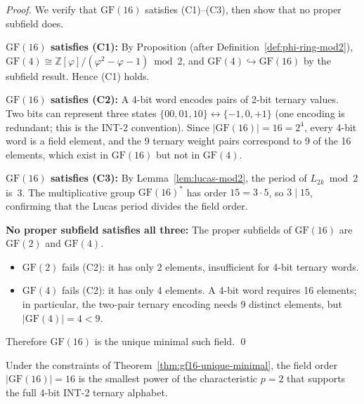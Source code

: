 \begin{proof}
We verify that \(\mathrm{GF}(16)\) satisfies (C1)–(C3), then show
that no proper subfield does.

\medskip
\noindent\textbf{\(\mathrm{GF}(16)\) satisfies (C1):}
By Proposition (after Definition~\ref{def:phi-ring-mod2}),
\(\mathrm{GF}(4) \cong \mathbb{Z}[\varphi]/(\varphi^2-\varphi-1)\bmod 2\),
and \(\mathrm{GF}(4)\hookrightarrow\mathrm{GF}(16)\) by the subfield result.
Hence (C1) holds.

\medskip
\noindent\textbf{\(\mathrm{GF}(16)\) satisfies (C2):}
A 4-bit word encodes pairs of 2-bit ternary values.
Two bits can represent three states \(\{00,01,10\}\leftrightarrow\{-1,0,+1\}\)
(one encoding is redundant; this is the INT-2 convention).
Since \(|\mathrm{GF}(16)|=16=2^4\), every 4-bit word is a field element,
and the 9 ternary weight pairs correspond to 9 of the 16 elements,
which exist in \(\mathrm{GF}(16)\) but not in \(\mathrm{GF}(4)\).

\medskip
\noindent\textbf{\(\mathrm{GF}(16)\) satisfies (C3):}
By Lemma~\ref{lem:lucas-mod2}, the period of \(L_{2k}\bmod 2\) is~3.
The multiplicative group \(\mathrm{GF}(16)^*\) has order \(15=3\cdot 5\),
so \(3 \mid 15\), confirming that the Lucas period divides the field order.

\medskip
\noindent\textbf{No proper subfield satisfies all three:}
The proper subfields of \(\mathrm{GF}(16)\) are \(\mathrm{GF}(2)\) and \(\mathrm{GF}(4)\).
\begin{itemize}
  \item \(\mathrm{GF}(2)\) fails (C2): it has only 2 elements, insufficient
        for 4-bit ternary words.
  \item \(\mathrm{GF}(4)\) fails (C2): it has only 4 elements.
        A 4-bit word requires 16 elements; in particular, the two-pair
        ternary encoding needs 9 distinct elements,
        but \(|\mathrm{GF}(4)|=4<9\).
\end{itemize}
Therefore \(\mathrm{GF}(16)\) is the unique minimal such field.
\qed
\end{proof}

\begin{corollary}
\label{cor:field-order-minimal}
Under the constraints of Theorem~\ref{thm:gf16-unique-minimal},
the field order \(|\mathrm{GF}(16)|=16\) is the smallest power of the
characteristic \(p=2\) that supports the full 4-bit INT-2 ternary alphabet.
\end{corollary}

